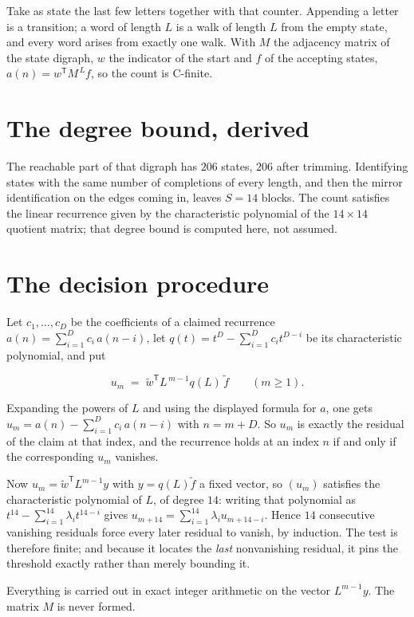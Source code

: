 \documentclass[11pt]{article}
\theoremstyle{definition}
\begin{document}
Take as state the last few letters together with that counter. Appending a letter is a transition; a word of length $L$ is a walk of length $L$ from the empty state, and every word arises from exactly one walk. With $M$ the adjacency matrix of the state digraph, $w$ the indicator of the start and $f$ of the accepting states, $a(n) = w^{\mathsf T}M^{\,L}f$, so the count is C-finite.

\section{The degree bound, derived}

The reachable part of that digraph has $206$ states, $206$ after trimming. Identifying states with the same number of completions of every length, and then the mirror identification on the edges coming in, leaves $S = 14$ blocks. The count satisfies the linear recurrence given by the characteristic polynomial of the $14\times14$ quotient matrix; that degree bound is computed here, not assumed.

\section{The decision procedure}

Let $c_1,\dots,c_D$ be the coefficients of a claimed recurrence $a(n) = \sum_{i=1}^{D} c_i\,a(n-i)$, let $q(t) = t^{D} - \sum_{i=1}^{D} c_i t^{D-i}$ be its characteristic polynomial, and put

\[u_m \;=\; \tilde w^{\mathsf T} L^{\,m-1} q(L)\,\tilde f \qquad (m \ge 1).\]

Expanding the powers of $L$ and using the displayed formula for $a$, one gets $u_m = a(n) - \sum_{i=1}^{D} c_i\,a(n-i)$ with $n = m + D$. So $u_m$ is exactly the residual of the claim at that index, and the recurrence holds at an index $n$ if and only if the corresponding $u_m$ vanishes.

Now $u_m = \tilde w^{\mathsf T} L^{m-1} y$ with $y = q(L)\tilde f$ a fixed vector, so $(u_m)$ satisfies the characteristic polynomial of $L$, of degree $14$: writing that polynomial as $t^{14} - \sum_{i=1}^{14} \lambda_i t^{14-i}$ gives $u_{m+14} = \sum_{i=1}^{14} \lambda_i u_{m+14-i}$. Hence $14$ consecutive vanishing residuals force every later residual to vanish, by induction. The test is therefore finite; and because it locates the {\itshape last} nonvanishing residual, it pins the threshold exactly rather than merely bounding it.

Everything is carried out in exact integer arithmetic on the vector $L^{m-1}y$. The matrix $M$ is never formed.
\end{document}
